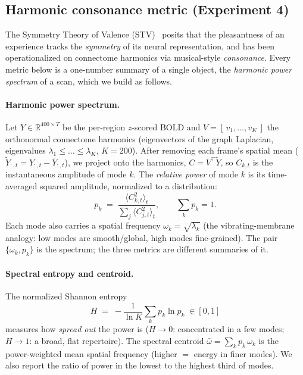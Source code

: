 \documentclass[10pt,a4paper]{article}
\begin{document}
\subsection{Harmonic consonance metric (Experiment 4)}
The Symmetry Theory of Valence (STV)~\cite{johnson2023} posits that the
pleasantness of an experience tracks the \emph{symmetry} of its neural
representation, and has been operationalized on connectome harmonics via
musical-style \emph{consonance}. Every metric below is a one-number summary of a
single object, the \emph{harmonic power spectrum} of a scan, which we build as
follows.

\paragraph{Harmonic power spectrum.} Let $Y\in\mathbb{R}^{400\times T}$ be the
per-region $z$-scored BOLD and $V=[\,v_1,\dots,v_K\,]$ the orthonormal connectome
harmonics (eigenvectors of the graph Laplacian, eigenvalues $\lambda_1\le\dots\le
\lambda_K$, $K=200$). After removing each frame's spatial mean
($\tilde Y_{:,t}=Y_{:,t}-\bar Y_{:,t}$), we project onto the harmonics,
$C=V^\top\tilde Y$, so $C_{k,t}$ is the instantaneous amplitude of mode $k$. The
\emph{relative power} of mode $k$ is its time-averaged squared amplitude,
normalized to a distribution:
\begin{equation}
p_k \;=\; \frac{\langle C_{k,t}^2\rangle_t}{\sum_{j}\langle C_{j,t}^2\rangle_t},
\qquad \sum_k p_k = 1 .
\end{equation}
Each mode also carries a spatial frequency $\omega_k=\sqrt{\lambda_k}$ (the
vibrating-membrane analogy: low modes are smooth/global, high modes fine-grained).
The pair $\{\omega_k,p_k\}$ is the spectrum; the three metrics are different
summaries of it.

\paragraph{Spectral entropy and centroid.} The normalized Shannon entropy
\begin{equation}
H \;=\; -\frac{1}{\ln K}\sum_{k} p_k \ln p_k \;\in[0,1]
\end{equation}
measures how \emph{spread out} the power is ($H\to 0$: concentrated in a few modes;
$H\to 1$: a broad, flat repertoire). The spectral centroid
$\bar\omega=\sum_k p_k\,\omega_k$ is the power-weighted mean spatial frequency
(higher $=$ energy in finer modes). We also report the ratio of power in the
lowest to the highest third of modes.
\end{document}
